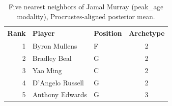\begin{table}[htbp]
  \centering\small
  \begin{tabular}{rllc}
    \toprule
    Rank & Player & Position & Archetype \\
    \midrule
    1 & Byron Mullens & F & 2 \\
    2 & Bradley Beal & G & 2 \\
    3 & Yao Ming & C & 2 \\
    4 & D'Angelo Russell & G & 2 \\
    5 & Anthony Edwards & G & 3 \\
    \bottomrule
  \end{tabular}
  \caption{Five nearest neighbors of Jamal Murray (peak_age modality), Procrustes-aligned posterior mean.}
  \label{tab:Jamal_Murray_neighbors_peak_age}
\end{table}


